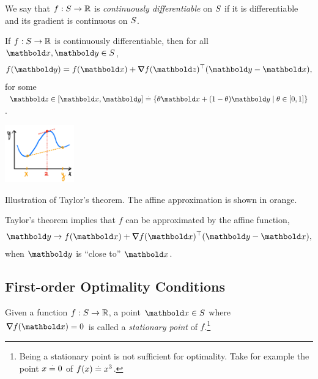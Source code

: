 \begin{defn} We say that $f : S \to \mathbb{R}$ is \emph{continuously differentiable} on $S$ if it is differentiable and its gradient is continuous on $S$.
\end{defn}

\begin{fct} If $f: S \to \mathbb{R}$ is continuously differentiable, then for all $\vx, \vy \in \sS$, \begin{align}
    f(\vy) = f(\vx) + \trans{\grad f(\vz)}(\vy - \vx),
\end{align} for some $\vz \in [\vx, \vy] \defeq \{\theta\vx + (1-\theta)\vy \mid \theta \in [0,1]\}$.
\end{fct}\begin{marginfigure}
\centering\includegraphics[width=3cm]{notes/figures/taylors_theorem.png}
\caption{Illustration of Taylor's theorem. The affine approximation is shown in orange.}
\end{marginfigure}\noindent Taylor's theorem implies that $f$ can be approximated by the affine function, \begin{align*}
    \vy \to f(\vx) + \trans{\grad f(\vx)}(\vy - \vx),
\end{align*} when $\vy$ is ``close to'' $\vx$.

\subsection{First-order Optimality Conditions}

\begin{defn} Given a function $f: S \to \mathbb{R}$, a point $\vx \in \sS$ where $\grad f(\vx) = 0$ is called a \emph{stationary point} of $f$.\footnote{Being a stationary point is not sufficient for optimality. Take for example the point $x \overset{.}{=} 0$ of $f(x) \overset{.}{=} x^3$.}
\end{defn}


